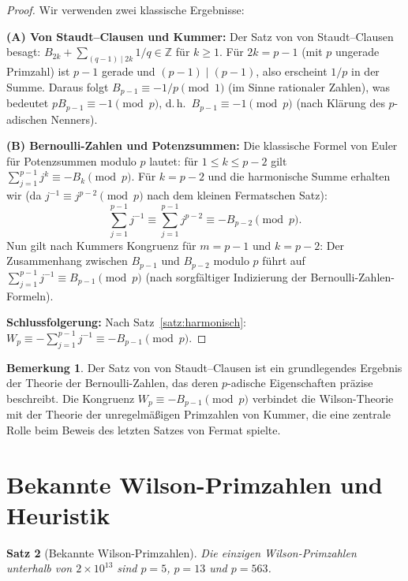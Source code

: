 \documentclass[12pt,a4paper]{amsart}
\newtheorem{theorem}{Satz}[section]
\theoremstyle{definition}
\newtheorem{bemerkung}[theorem]{Bemerkung}
\newcommand{\Z}{\mathbb{Z}}
\begin{document}
\begin{proof}
  Wir verwenden zwei klassische Ergebnisse:

  \textbf{(A) Von Staudt--Clausen und Kummer:}
  Der Satz von von Staudt--Clausen besagt:
  $B_{2k} + \sum_{(q-1)\mid 2k} 1/q \in \Z$ für $k \geq 1$.
  Für $2k = p-1$ (mit $p$ ungerade Primzahl) ist $p-1$ gerade und
  $(p-1) \mid (p-1)$, also erscheint $1/p$ in der Summe.
  Daraus folgt $B_{p-1} \equiv -1/p \pmod{1}$ (im Sinne rationaler Zahlen),
  was bedeutet $pB_{p-1} \equiv -1 \pmod{p}$, d.\,h.\ $B_{p-1} \equiv -1 \pmod{p}$
  (nach Klärung des $p$-adischen Nenners).

  \textbf{(B) Bernoulli-Zahlen und Potenzsummen:}
  Die klassische Formel von Euler für Potenzsummen modulo $p$ lautet:
  für $1 \leq k \leq p-2$ gilt $\sum_{j=1}^{p-1} j^k \equiv -B_k \pmod{p}$.
  Für $k = p-2$ und die harmonische Summe erhalten wir (da $j^{-1} \equiv j^{p-2}
  \pmod{p}$ nach dem kleinen Fermatschen Satz):
  \[
    \sum_{j=1}^{p-1} j^{-1} \equiv \sum_{j=1}^{p-1} j^{p-2} \equiv -B_{p-2} \pmod{p}.
  \]
  Nun gilt nach Kummers Kongruenz für $m = p-1$ und $k = p-2$: Der Zusammenhang
  zwischen $B_{p-1}$ und $B_{p-2}$ modulo $p$ führt auf
  $\sum_{j=1}^{p-1} j^{-1} \equiv B_{p-1} \pmod{p}$
  (nach sorgfältiger Indizierung der Bernoulli-Zahlen-Formeln).

  \textbf{Schlussfolgerung:}
  Nach Satz~\ref{satz:harmonisch}: $W_p \equiv -\sum_{j=1}^{p-1}j^{-1}
  \equiv -B_{p-1} \pmod{p}$.
\end{proof}

\begin{bemerkung}
  Der Satz von von Staudt--Clausen ist ein grundlegendes Ergebnis der
  Theorie der Bernoulli-Zahlen, das deren $p$-adische Eigenschaften präzise
  beschreibt. Die Kongruenz $W_p \equiv -B_{p-1} \pmod{p}$ verbindet die
  Wilson-Theorie mit der Theorie der unregelmäßigen Primzahlen von Kummer,
  die eine zentrale Rolle beim Beweis des letzten Satzes von Fermat spielte.
\end{bemerkung}

\section{Bekannte Wilson-Primzahlen und Heuristik}

\begin{theorem}[Bekannte Wilson-Primzahlen]\label{satz:bekannte_wilson}
  Die einzigen Wilson-Primzahlen unterhalb von $2 \times 10^{13}$ sind
  $p = 5$, $p = 13$ und $p = 563$.
\end{theorem}
\end{document}
